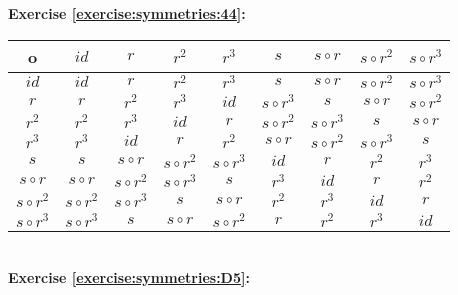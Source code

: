 \noindent\textbf{Exercise \ref{exercise:symmetries:44}:}\\
	\begin{tabular}{c| c c c c c c c c }
		o & $id$ & $r$ & $r^2$ & $r^3$ & $s$ & $s\circ r$ & $s\circ r^2$ & $s\circ r^3$\\
		\hline
		$id$ & $id$ & $r$ & $r^2$ & $r^3$ & $s$ & $s\circ r$ & $s\circ r^2$ & $s\circ r^3$\\
		$r$ & $r$ & $r^2$ & $r^3$ & $id$ & $s\circ r^3$ & $s$ & $s\circ r$ & $s\circ r^2$\\
		$r^2$ & $r^2$ & $r^3$ & $id$ & $r$ & $s\circ r^2$ & $s\circ r^3$ & $s$ & $s\circ r$\\
		$r^3$ & $r^3$ & $id$ & $r$ & $r^2$ & $s\circ r$ & $s\circ r^2$ & $s\circ r^3$ & $s$\\
		$s$ & $s$ & $s\circ r$ & $s\circ r^2$ & $s\circ r^3$ & $id$ & $r$ & $r^2$ & $r^3$\\
		$s\circ r$ & $s\circ r$ & $s\circ r^2$ & $s\circ r^3$ & $s$ & $r^3$ & $id$ & $r$ & $r^2$\\
		$s\circ r^2$ & $s\circ r^2$ & $s\circ r^3$ & $s$ & $s\circ r$ & $r^2$ & $r^3$ & $id$ & $r$\\
		$s\circ r^3$ & $s\circ r^3$ & $s$ & $s\circ r$ & $s\circ r^2$ & $r$ & $r^2$ & $r^3$ & $id$
	\end{tabular}
\\

\noindent\textbf{Exercise \ref{exercise:symmetries:D5}:}
\\

